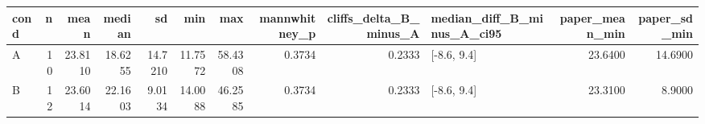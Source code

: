 \begin{tabular}{lrrrrrrrrlrr}
\toprule
cond &  n &    mean &  median &      sd &     min &     max &  mannwhitney\_p &  cliffs\_delta\_B\_minus\_A & median\_diff\_B\_minus\_A\_ci95 &  paper\_mean\_min &  paper\_sd\_min \\
\midrule
   A & 10 & 23.8110 & 18.6255 & 14.7210 & 11.7572 & 58.4308 &         0.3734 &                  0.2333 &                [-8.6, 9.4] &         23.6400 &       14.6900 \\
   B & 12 & 23.6014 & 22.1603 &  9.0134 & 14.0088 & 46.2585 &         0.3734 &                  0.2333 &                [-8.6, 9.4] &         23.3100 &        8.9000 \\
\bottomrule
\end{tabular}
